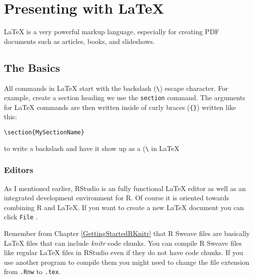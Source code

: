 



\chapter{Presenting with LaTeX}\label{LatexChapter}

LaTeX is a very powerful markup language, especially for creating PDF documents such as articles, books, and slideshows.


\section{The Basics}

All commands in LaTeX start with the backslash (\texttt{\textbackslash{}}) escape character. For example, create a section heading we use the \texttt{section} command. The arguments for LaTeX commands are then written inside of curly braces (\texttt{\{\}}) written like this:

\begin{knitrout}
\color{fgcolor}\begin{kframe}
\begin{alltt}
\textbackslash{}section\{My Section Name\}
\end{alltt}
\end{kframe}
\end{knitrout}


\noindent to write a backslash and have it show up as a (\texttt{\textbackslash{}} in LaTeX

\subsection{Editors}

As I mentioned earlier, RStudio is an fully functional LaTeX editor as well as an integrated development environment for R. Of course it is oriented towards combining R and LaTeX. If you want to create a new LaTeX document you can click {\tt{File}}  . 

Remember from Chapter \ref{GettingStartedRKnitr} that R Sweave files are basically LaTeX files that can include {\emph{knitr}} code chunks. You can compile R Sweave files like regular LaTeX files in RStudio even if they do not have code chunks. If you use another program to compile them you might need to change the file extension from {\tt{.Rnw}} to {\tt{.tex}}.

